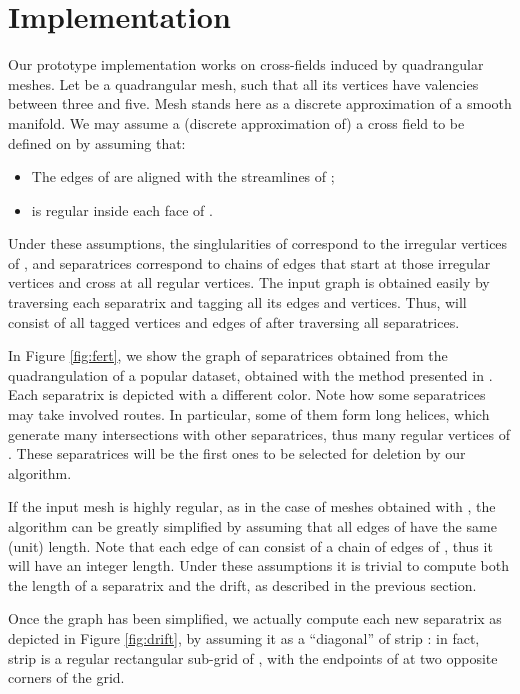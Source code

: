 \documentclass[11pt,a4paper]{article}
\begin{document}
\section{Implementation}
\label{sec:implementation}

Our prototype implementation works on cross-fields induced by quadrangular meshes.
Let  be a quadrangular mesh, such that all its vertices have valencies between three and five.
Mesh  stands here as a discrete approximation of a smooth manifold.
We may assume a (discrete approximation of) a cross field  to be defined on  by assuming that:
\begin{itemize}
\item The edges of  are aligned with the streamlines of ;
\item  is regular inside each face of .
\end{itemize}
Under these assumptions, the singlularities of  correspond to the irregular vertices of , and separatrices correspond to chains of edges that start at those irregular vertices and cross at all regular vertices.
The input graph  is obtained easily by traversing each separatrix and tagging all its edges and vertices.
Thus,  will consist of all tagged vertices and edges of  after traversing all separatrices.

In Figure \ref{fig:fert}, we show the graph of separatrices obtained from the quadrangulation of a popular dataset, obtained with the method presented in \cite{BomZimKob09}.
Each separatrix is depicted with a different color.
Note how some separatrices may take involved routes. 
In particular, some of them form long helices, which generate many intersections with other separatrices, thus many regular vertices of .
These separatrices will be the first ones to be selected for deletion by our algorithm.

If the input mesh  is highly regular, as in the case of meshes obtained with \cite{BomZimKob09}, the algorithm can be greatly simplified by assuming that all edges of  have the same (unit) length.
Note that each edge of  can consist of a chain of edges of , thus it will have an integer length.
Under these assumptions it is trivial to compute both the length of a separatrix and the drift, as described in the previous section. 

Once the graph has been simplified, we actually compute each new separatrix  as depicted in Figure \ref{fig:drift}, by assuming it as a ``diagonal'' of strip :
in fact, strip  is a regular rectangular sub-grid of , with the endpoints of   at two opposite corners of the grid. 
\end{document}
